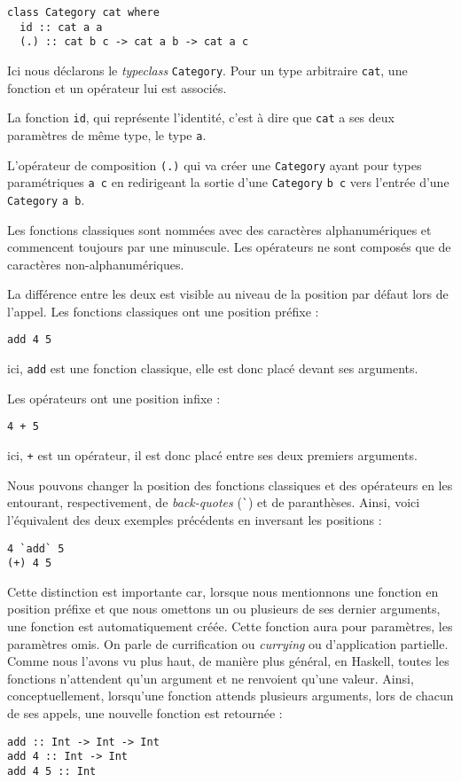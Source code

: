 \documentclass{llncs}
\begin{document}
\begin{lstlisting}
class Category cat where
  id :: cat a a
  (.) :: cat b c -> cat a b -> cat a c
\end{lstlisting}

Ici nous déclarons le \emph{typeclass} \lstinline{Category}.
Pour un type arbitraire \lstinline{cat}, une fonction et un opérateur lui est
associés.

La fonction \lstinline{id}, qui représente l'identité, c'est à dire
que \lstinline{cat} a ses deux paramètres de même type, le type \lstinline{a}.

L'opérateur de composition \lstinline{(.)} qui va créer une \lstinline{Category}
ayant pour types paramétriques \lstinline{a c} en redirigeant la sortie d'une
\lstinline{Category} \lstinline{b c} vers l'entrée d'une \lstinline{Category} \lstinline{a b}.

Les fonctions classiques sont nommées avec des caractères alphanumériques et commencent
toujours par une minuscule.
Les opérateurs ne sont composés que de caractères non-alphanumériques.

La différence entre les deux est visible au niveau de la position par défaut lors
de l'appel.
Les fonctions classiques ont une position préfixe :
\begin{lstlisting}
add 4 5
\end{lstlisting}

ici, \lstinline{add} est une fonction classique, elle est donc placé devant ses
arguments.

Les opérateurs ont une position infixe :
\begin{lstlisting}
4 + 5
\end{lstlisting}

ici, \lstinline{+} est un opérateur, il est donc placé entre ses deux premiers
arguments.

Nous pouvons changer la position des fonctions classiques et des opérateurs en
les entourant, respectivement, de \emph{back-quotes} (\lstinline{`}) et de paranthèses.
Ainsi, voici l'équivalent des deux exemples précédents en inversant les positions :
\begin{lstlisting}
4 `add` 5
(+) 4 5
\end{lstlisting}

Cette distinction est importante car, lorsque nous mentionnons une fonction en position
préfixe et que nous omettons un ou plusieurs de ses dernier arguments, une fonction
est automatiquement créée.
Cette fonction aura pour paramètres, les paramètres omis.
On parle de currification ou \emph{currying} ou d'application partielle.
Comme nous l'avons vu plus haut, de manière plus général, en Haskell, toutes les
fonctions n'attendent qu'un argument et ne renvoient qu'une valeur.
Ainsi, conceptuellement, lorsqu'une fonction attends plusieurs arguments, lors de
chacun de ses appels, une nouvelle fonction est retournée :
\begin{lstlisting}
add :: Int -> Int -> Int
add 4 :: Int -> Int
add 4 5 :: Int
\end{lstlisting}
\end{document}
